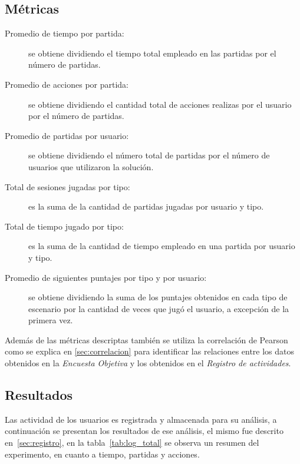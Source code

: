 \subsection{Métricas}

\begin{description}
\item[Promedio de tiempo por partida:] se obtiene dividiendo el tiempo total empleado 
    en las partidas por el número de partidas.
\item[Promedio de acciones por partida:] se obtiene dividiendo el cantidad total de 
    acciones realizas por el usuario por el número de partidas.
\item[Promedio de partidas por usuario:] se obtiene dividiendo el número total de partidas
    por el número de usuarios que utilizaron la solución.
\item[Total de sesiones jugadas por tipo:] es la suma de la cantidad de partidas jugadas por 
    usuario y tipo.
\item[Total de tiempo jugado por tipo:] es la suma de la cantidad de tiempo empleado en una 
    partida por usuario y tipo.
\item[Promedio de siguientes puntajes por tipo y por usuario:] se obtiene dividiendo la suma 
    de los puntajes obtenidos en cada tipo de escenario por la cantidad de veces que jugó el 
    usuario, a excepción de la primera vez.
\end{description}

Además de las métricas descriptas también se utiliza la correlación de Pearson como se 
explica en \ref{sec:correlacion} para identificar las relaciones entre los datos obtenidos en 
la \emph{Encuesta Objetiva} y los obtenidos en el \emph{Registro de actividades}.

\subsection{Resultados}

Las actividad de los usuarios es registrada y almacenada para su análisis, a
continuación se presentan los resultados de ese análisis, el mismo fue descrito
en~\ref{sec:registro}, en la tabla~\ref{tab:log_total} se observa un resumen del
experimento, en cuanto a tiempo, partidas y acciones.


